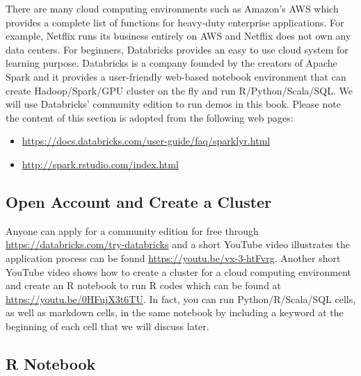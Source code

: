 \documentclass[
]{article}
\providecommand{\tightlist}{%
  \setlength{\itemsep}{0pt}\setlength{\parskip}{0pt}}
\begin{document}
There are many cloud computing environments such as Amazon's AWS which
provides a complete list of functions for heavy-duty enterprise
applications. For example, Netflix runs its business entirely on AWS and
Netflix does not own any data centers. For beginners, Databricks
provides an easy to use cloud system for learning purpose. Databricks is
a company founded by the creators of Apache Spark and it provides a
user-friendly web-based notebook environment that can create
Hadoop/Spark/GPU cluster on the fly and run R/Python/Scala/SQL. We will
use Databricks' community edition to run demos in this book. Please note
the content of this section is adopted from the following web pages:

\begin{itemize}
\tightlist
\item
  \url{https://docs.databricks.com/user-guide/faq/sparklyr.html}
\item
  \url{http://spark.rstudio.com/index.html}
\end{itemize}

\hypertarget{open-account-and-create-a-cluster}{%
\subsection{Open Account and Create a
Cluster}\label{open-account-and-create-a-cluster}}

Anyone can apply for a community edition for free through
\url{https://databricks.com/try-databricks} and a short YouTube video
illustrates the application process can be found
\url{https://youtu.be/vx-3-htFvrg}. Another short YouTube video shows
how to create a cluster for a cloud computing environment and create an
R notebook to run R codes which can be found at
\url{https://youtu.be/0HFujX3t6TU}. In fact, you can run
Python/R/Scala/SQL cells, as well as markdown cells, in the same
notebook by including a keyword at the beginning of each cell that we
will discuss later.

\hypertarget{r-notebook}{%
\subsection{R Notebook}\label{r-notebook}}
\end{document}
